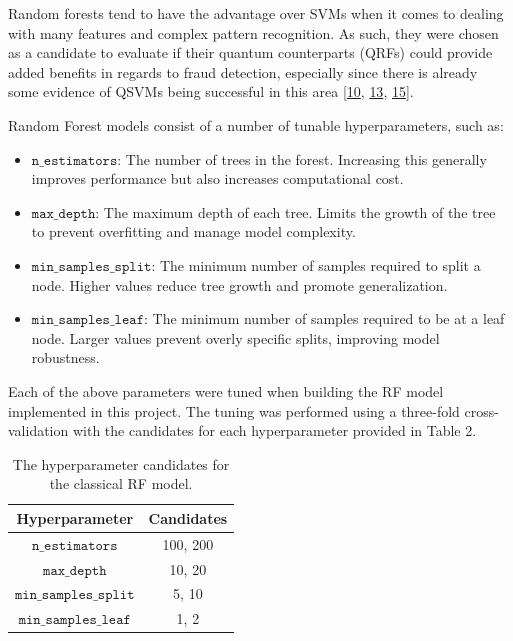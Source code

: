 \documentclass[11pt, oneside]{article}   	%
\begin{document}
Random forests tend to have the advantage over SVMs when it comes to dealing with many features and complex pattern recognition. As such, they were chosen as a candidate to evaluate if their quantum counterparts (QRFs) could provide added benefits in regards to fraud detection, especially since there is already some evidence of QSVMs being successful in this area [\href{https://www.researchsquare.com/article/rs-1434074/v1}{10}, \href{https://doi.org/10.34190/eccws.23.1.2258}{13}, \href{https://doi.org/10.48550/arXiv.2208.01203}{15}].

Random Forest models consist of a number of tunable hyperparameters, such as:

\begin{itemize}
    \item $\texttt{n\_estimators}$: The number of trees in the forest. Increasing this generally improves performance but also increases computational cost.
    \item $\texttt{max\_depth}$: The maximum depth of each tree. Limits the growth of the tree to prevent overfitting and manage model complexity.
    \item $\texttt{min\_samples\_split}$: The minimum number of samples required to split a node. Higher values reduce tree growth and promote generalization.
    \item $\texttt{min\_samples\_leaf}$: The minimum number of samples required to be at a leaf node. Larger values prevent overly specific splits, improving model robustness.
\end{itemize}

Each of the above parameters were tuned when building the RF model implemented in this project. The tuning was performed using a three-fold cross-validation with the candidates for each hyperparameter provided in Table 2.\\

\begin{table}[h!]
    \centering
    \begin{tabular}{|c|c|}
        \hline
        \textbf{Hyperparameter} & \textbf{Candidates} \\ \hline
        $\texttt{n\_estimators}$ &  100, 200 \\ \hline
        $\texttt{max\_depth}$ & 10, 20 \\ \hline
        $\texttt{min\_samples\_split}$ & 5, 10 \\ \hline
        $\texttt{min\_samples\_leaf}$ & 1, 2 \\ \hline
    \end{tabular}
    \caption{The hyperparameter candidates for the classical RF model.}
    \label{tab2}
\end{table}
\end{document}
